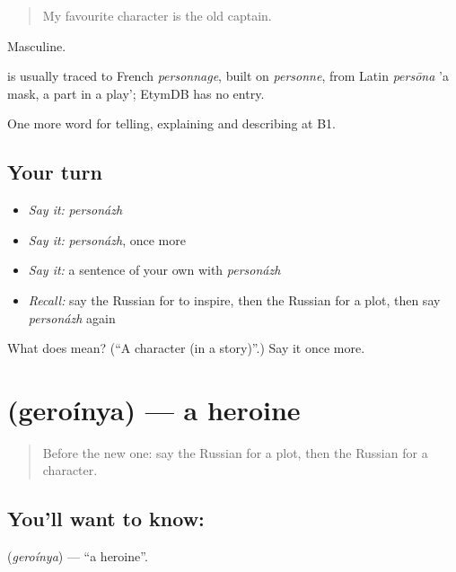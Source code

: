 \begin{quote}
My favourite character is the old captain.
\end{quote}

Masculine.

\begin{cousinweb}
\emph{} is usually traced to French \emph{personnage}, built on \emph{personne}, from Latin \emph{persōna} 'a mask, a part in a play'; EtymDB has no entry.
\end{cousinweb}

\begin{grammarlens}[title={What you've built}]
One more word for telling, explaining and describing at B1.
\end{grammarlens}

\subsection*{Your turn}
\begin{itemize}
\raggedright
  \item \emph{Say it:} \emph{personázh}
  \item \emph{Say it:} \emph{personázh}, once more
  \item \emph{Say it:} a sentence of your own with \emph{personázh}
  \item \emph{Recall:} say the Russian for to inspire, then the Russian for a plot, then say \emph{personázh} again
\end{itemize}

\begin{tcolorbox}[breakable,colback=teal!4,colframe=teal!35!black,title={Before you move on}]
What does  mean? (\textquotedblleft{}A character (in a story)\textquotedblright{}.) Say it once more.
\end{tcolorbox}
\section[\texorpdfstring{\ru{героиня} (geroínya)}{героиня (geroínya)}]{ (geroínya) — a heroine}

\label{lesson:RU-C523-geroinya}



\begin{quote}
Before the new one: say the Russian for a plot, then the Russian for a character.
\end{quote}

\subsection*{You'll want to know: }
\textbf{} (\emph{geroínya}) — \textquotedblleft{}a heroine\textquotedblright{}.

